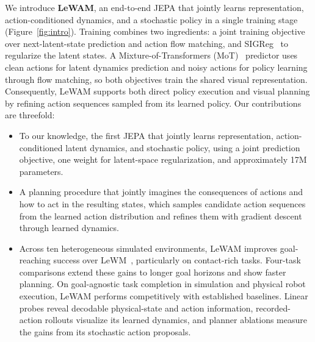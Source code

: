 \documentclass{article} %
\newcommand{\methodname}[1]{\textup{#1}}
\newcommand{\method}{\methodname{LeWAM}}
\newcommand{\methodintro}{\textbf{\textup{LeWAM}}}
\begin{document}
We introduce \methodintro{}, an end-to-end JEPA that jointly learns
representation, action-conditioned dynamics, and a stochastic policy
in a single training stage (Figure~\ref{fig:intro}). Training combines two ingredients: a joint training objective over next-latent-state prediction and action flow matching, and \methodname{SIGReg}~\citep{balestriero2025lejepa}
to regularize the latent states. A Mixture-of-Transformers (MoT)~\citep{liang2025MoT} predictor uses clean actions for latent dynamics prediction and noisy actions for policy learning through flow matching, so both objectives train the shared visual representation. Consequently, LeWAM supports both direct policy execution and visual planning by refining action sequences sampled from its learned policy. Our contributions are threefold:
\begin{itemize}
    \item To our knowledge, the first JEPA that jointly learns representation, action-conditioned latent dynamics, and stochastic policy, using a joint prediction objective, one weight for latent-space regularization, and approximately 17M parameters.
    
    \item A planning procedure that jointly imagines the consequences of actions and how to act in the resulting states, which samples candidate action sequences from the learned action distribution and refines them with gradient descent through learned dynamics.

    \item Across ten heterogeneous simulated environments, \method{} improves goal-reaching success over \methodname{LeWM}~\citep{maes2026lewm}, particularly on contact-rich tasks. Four-task comparisons extend these gains to longer goal horizons and show faster planning. On goal-agnostic task completion in simulation and physical robot execution, \method{} performs competitively with established baselines. Linear probes reveal decodable physical-state and action information, recorded-action rollouts visualize its learned dynamics, and planner ablations measure the gains from its stochastic action proposals.
\end{itemize}
\end{document}
